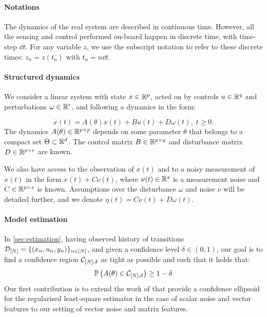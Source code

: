 \documentclass{article}
\begin{document}
\paragraph{Notations}

The dynamics of the real system are described in continuous time. However, all the sensing and control performed on-board happen in discrete time, with time-step $\dd t$. For any variable $z$, we use the subscript notation to refer to these discrete times: $z_n = z(t_n)$ with $t_n = n\dd t$.

\paragraph{Structured dynamics}
We consider a linear system with state $x\in\mathbb{R}^p$, acted on by controls $u\in\mathbb{R}^q$ and perturbations $\omega\in\mathbb{R}^r$, and following a dynamics in the form:

\begin{equation}
\label{eq:dynamics}
\dot{x}(t)=A(\theta)x(t) + B u(t) + D \omega(t),\;t\geq0.
\end{equation}
The dynamics $A(\theta)\in\mathbb{R}^{p\times p}$  depends on some parameter $\theta$ that belongs to a compact set $\Theta \subset \mathbb{R}^d$. The control matrix $B\in\mathbb{R}^{p\times q}$ and disturbance matrix $D\in\mathbb{R}^{p\times r}$ are known.

We also have access to the observation of $x(t)$ and to a noisy measurement of $\dot{x}(t)$ in the form $\dot{x}(t) + C\nu(t)$, where $\nu(t)\in\mathbb{R}^s$ is a measurement noise and $C\in\mathbb{R}^{p\times s}$ is known. Assumptions over the disturbance $\omega$ and noise $\nu$ will be detailed further, and we denote $\eta(t) = C\nu(t) + D\omega(t)$.

\paragraph{Model estimation}

In \autoref{sec:estimation}, having observed history of transitions $\mathcal{D}_{[N]} = \{(x_n, u_n, y_n)\}_{n\in[N]}$, and given a confidence level $\delta\in(0, 1)$, our goal is to find a confidence region $\mathcal{C}_{[N],\delta}$ as tight as possible and such that it holds that:
\begin{align}
\mathbb{P}\left(A(\theta)\in \mathcal{C}_{[N],\delta}\right) \geq 1-\delta
\label{eq:polytope}
\end{align}
Our first contribution is to extend the work of \citet{Abbasi2011} that provide a confidence ellipsoid for the regularised least-square estimator in the case of scalar noise and vector features to our setting of vector noise and matrix features.
\end{document}
